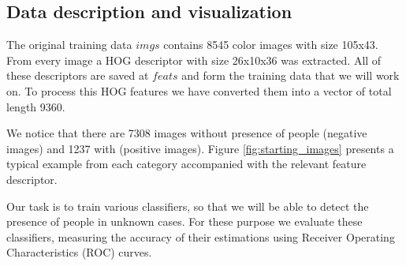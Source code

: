 \subsection{Data description and visualization}
The original training data $imgs$ contains 8545 color images with size 105x43. From every image a HOG descriptor with size 26x10x36 was extracted. All of these descriptors are saved at $feats$ and form the training data that we will work on. To process this HOG features we have converted them into a vector of total length 9360.

\noindent We notice that there are 7308 images without presence of people (negative images) and 1237 with (positive images). Figure \ref{fig:starting_images} presents a typical example from each category accompanied with the relevant feature descriptor.

\noindent Our task is to train various classifiers, so that we will be able to detect the presence of people in unknown cases. For these purpose we evaluate these classifiers, measuring the accuracy of their estimations using Receiver Operating Characteristics (ROC) curves.

